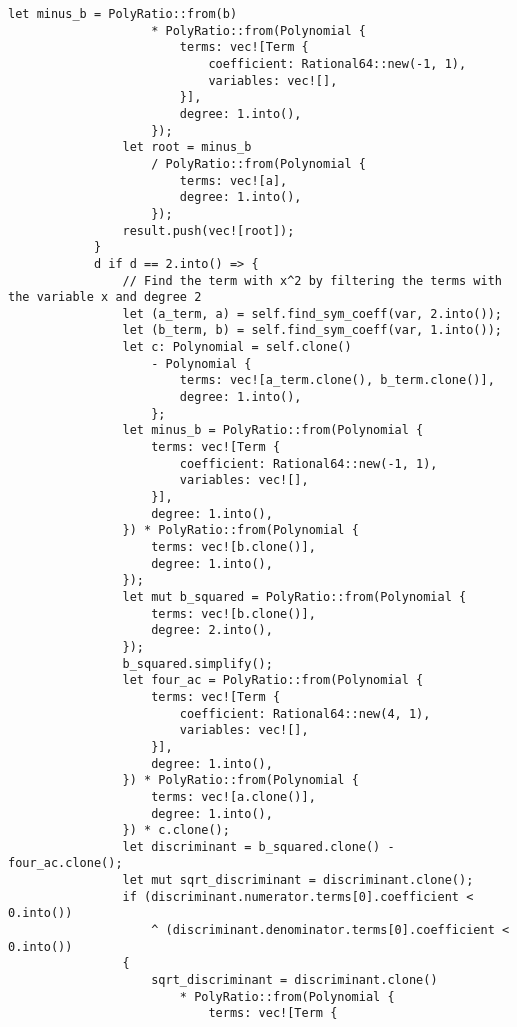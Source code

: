 \begin{lstlisting}[caption={The implementation of the \texttt{roots()} method for the \texttt{Polynomial} struct}, label={lst:polynomial-roots}]
                let minus_b = PolyRatio::from(b)
                    * PolyRatio::from(Polynomial {
                        terms: vec![Term {
                            coefficient: Rational64::new(-1, 1),
                            variables: vec![],
                        }],
                        degree: 1.into(),
                    });
                let root = minus_b
                    / PolyRatio::from(Polynomial {
                        terms: vec![a],
                        degree: 1.into(),
                    });
                result.push(vec![root]);
            }
            d if d == 2.into() => {
                // Find the term with x^2 by filtering the terms with the variable x and degree 2
                let (a_term, a) = self.find_sym_coeff(var, 2.into());
                let (b_term, b) = self.find_sym_coeff(var, 1.into());
                let c: Polynomial = self.clone()
                    - Polynomial {
                        terms: vec![a_term.clone(), b_term.clone()],
                        degree: 1.into(),
                    };
                let minus_b = PolyRatio::from(Polynomial {
                    terms: vec![Term {
                        coefficient: Rational64::new(-1, 1),
                        variables: vec![],
                    }],
                    degree: 1.into(),
                }) * PolyRatio::from(Polynomial {
                    terms: vec![b.clone()],
                    degree: 1.into(),
                });
                let mut b_squared = PolyRatio::from(Polynomial {
                    terms: vec![b.clone()],
                    degree: 2.into(),
                });
                b_squared.simplify();
                let four_ac = PolyRatio::from(Polynomial {
                    terms: vec![Term {
                        coefficient: Rational64::new(4, 1),
                        variables: vec![],
                    }],
                    degree: 1.into(),
                }) * PolyRatio::from(Polynomial {
                    terms: vec![a.clone()],
                    degree: 1.into(),
                }) * c.clone();
                let discriminant = b_squared.clone() - four_ac.clone();
                let mut sqrt_discriminant = discriminant.clone();
                if (discriminant.numerator.terms[0].coefficient < 0.into())
                    ^ (discriminant.denominator.terms[0].coefficient < 0.into())
                {
                    sqrt_discriminant = discriminant.clone()
                        * PolyRatio::from(Polynomial {
                            terms: vec![Term {

\end{lstlisting}
